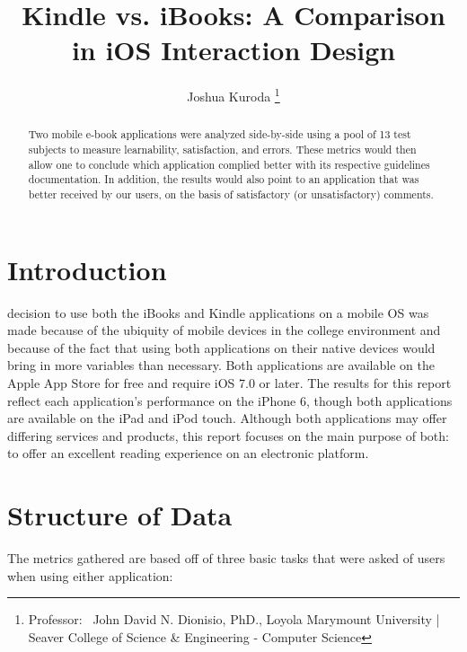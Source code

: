 \documentclass[journal, a4paper]{IEEEtran}
\begin{document}
	\title{Kindle vs. iBooks: A Comparison in iOS Interaction Design}
	\author{Joshua Kuroda
	\thanks{Professor: ~John David N. Dionisio, PhD., Loyola Marymount University | Seaver College of Science \& Engineering - Computer Science}}
	\maketitle

\begin{abstract}
	Two mobile e-book applications were analyzed side-by-side using a pool of 13 test subjects to measure learnability, satisfaction, and errors. These metrics would then allow one to conclude which application complied better with its respective guidelines documentation. In addition, the results would also point to an application that was better received by our users, on the basis of satisfactory (or unsatisfactory) comments.
\end{abstract}

\section{Introduction}
	 decision to use both the iBooks and Kindle applications on a mobile OS was made because of the ubiquity of mobile devices in the college environment and because of the fact that using both applications on their native devices would bring in more variables than necessary. Both applications are available on the Apple App Store for free and require iOS 7.0 or later. The results for this report reflect each application's performance on the iPhone 6, though both applications are available on the iPad and iPod touch. Although both applications may offer differing services and products, this report focuses on the main purpose of both: to offer an excellent reading experience on an electronic platform.

\section{Structure of Data}
	The metrics gathered are based off of three basic tasks that were asked of users when using either application: \\
    
\end{document}
